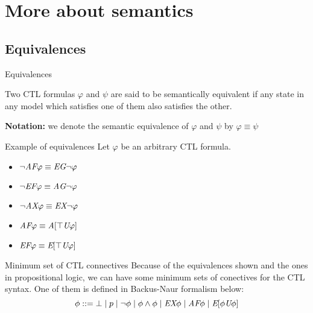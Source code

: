 \section{More about semantics}
\subsection{Equivalences}

\begin{frame}{Equivalences}
	\begin{definition}
		Two CTL formulas $\varphi$ and $\psi$ are said to be \alert{semantically	equivalent} if any state in any model which satisfies one of them also satisfies the other.
	\end{definition}\pause
	\textbf{Notation:} we denote the semantic equivalence of $\varphi$ and $\psi$ by $\varphi \equiv \psi$
\end{frame}

\begin{frame}{Example of equivalences}
    Let $\varphi$ be an arbitrary CTL formula.
        
    \begin{itemize}
        \item
        {
            $\neg \textit{A}\textit{F} \varphi \equiv \textit{E}\textit{G} \neg \varphi $    
            \pause
        }
        \item
        {
            $\neg \textit{E}\textit{F} \varphi \equiv \textit{A}\textit{G} \neg \varphi$    
            \pause    
        }
        \item
        {
            $\neg \textit{A}\textit{X} \varphi \equiv \textit{E}\textit{X} \neg \varphi$    
            \pause
        }
        \item
        {
            $\textit{A}\textit{F}\varphi \equiv \textit{A}[\top \textit{U}\varphi]$    
            \pause
        }
        \item
        {
            $\textit{E}\textit{F} \varphi \equiv \textit{E}[\top \textit{U}\varphi]$
        }
    \end{itemize}
\end{frame}

\begin{frame}{Minimum set of CTL connectives}
    Because of the equivalences shown and the ones in propositional logic, we can have some minimum sets of conectives for the CTL syntax. One of them is defined in Backus-Naur formalism below:
    $$\phi ::=  \bot \; | \; p \; | \; \neg \phi \; | \; \phi \land \phi \; | \; \textit{E}\textit{X} \phi \; | \;  \textit{A}\textit{F}\phi \; | \; \textit{E}[\phi\textit{U}\phi]$$
\end{frame}